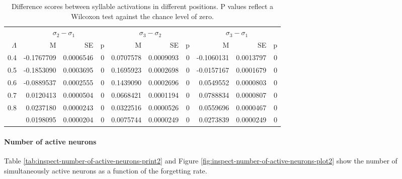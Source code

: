 \documentclass[
]{article}
\begin{document}
\begin{table}

\caption{\label{tab:basic-experiment-global-print-act-in-words-table2}Difference scores between syllable activations in different positions. P values reflect a Wilcoxon test against the chance level of zero.}
\centering
\begin{tabular}[t]{rrrrrrrrrr}
\toprule
\multicolumn{1}{c}{ } & \multicolumn{3}{c}{$\sigma_2 - \sigma_1$} & \multicolumn{3}{c}{$\sigma_3 - \sigma_2$} & \multicolumn{3}{c}{$\sigma_3 - \sigma_1$} \\
\cmidrule(l{3pt}r{3pt}){2-4} \cmidrule(l{3pt}r{3pt}){5-7} \cmidrule(l{3pt}r{3pt}){8-10}
$\Lambda$ & M & SE & p & M & SE & p & M & SE & p\\
\midrule
0.4 & -0.1767709 & 0.0006546 & 0 & 0.0707578 & 0.0009093 & 0 & -0.1060131 & 0.0013797 & 0\\
0.5 & -0.1853090 & 0.0003695 & 0 & 0.1695923 & 0.0002698 & 0 & -0.0157167 & 0.0001679 & 0\\
0.6 & -0.0889537 & 0.0002555 & 0 & 0.1439090 & 0.0002696 & 0 & 0.0549552 & 0.0000803 & 0\\
0.7 & 0.0120413 & 0.0000504 & 0 & 0.0668421 & 0.0001194 & 0 & 0.0788834 & 0.0000807 & 0\\
0.8 & 0.0237180 & 0.0000243 & 0 & 0.0322516 & 0.0000526 & 0 & 0.0559696 & 0.0000467 & 0\\
\addlinespace
0.9 & 0.0198095 & 0.0000204 & 0 & 0.0075744 & 0.0000249 & 0 & 0.0273839 & 0.0000249 & 0\\
\bottomrule
\end{tabular}
\end{table}

\clearpage

\hypertarget{number-of-active-neurons}{%
\paragraph{Number of active neurons}\label{number-of-active-neurons}}

Table \ref{tab:inspect-number-of-active-neurons-print2} and Figure
\ref{fig:inspect-number-of-active-neurons-plot2} show the number of
simultaneously active neurons as a function of the forgetting rate.
\end{document}
